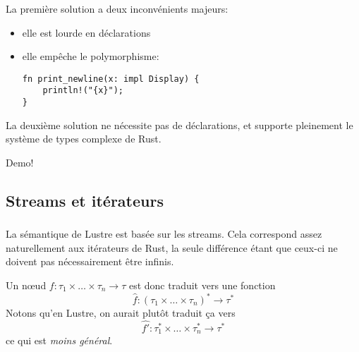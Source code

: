 \documentclass[professionalfonts]{beamer}
\makeatletter
\newcommand*{\currentname}{\@currentlabelname}
\makeatother
\begin{document}
\begin{frame}[fragile]
  \frametitle{\currentname}

  La première solution a deux inconvénients majeurs:\pause
  \begin{itemize}
  \item elle est lourde en déclarations
    \pause
  \item
    elle empêche le polymorphisme:
    \begin{verbatim}
fn print_newline(x: impl Display) {
    println!("{x}");
}
    \end{verbatim}
  \end{itemize}
  \pause La deuxième solution ne nécessite pas de déclarations, et supporte pleinement le système
  de types complexe de Rust.\pause
  \begin{center}
    Demo! %
  \end{center}
\end{frame}

\subsection{Streams et itérateurs}
\begin{frame}
  \frametitle{\currentname}
  
  La sémantique de Lustre est basée sur les streams. Cela correspond assez naturellement aux
  itérateurs de Rust, la seule différence étant que ceux-ci ne doivent pas nécessairement être
  infinis.\pause\par
  Un nœud \(f : \tau_1 \times \ldots \times \tau_n \to \tau\) est donc traduit vers une fonction
  \[\hat{f} : (\tau_1\times\ldots\times\tau_n)^*\to\tau^*\]
  \pause
  Notons qu'en Lustre, on aurait plutôt traduit ça vers \[
    \hat{f'} : \tau_1^*\times\ldots\times\tau_n^*\to\tau^*
  \]
  ce qui est \emph{moins général}.
\end{frame}
\end{document}

